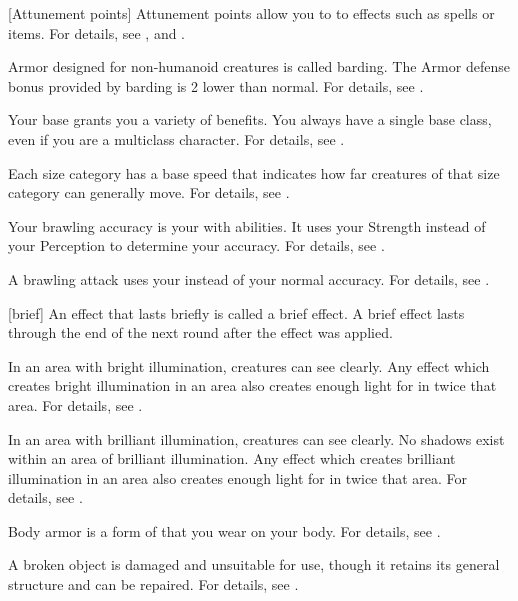 [Attunement points] Attunement points allow you to  to effects such as spells or items.
For details, see , and .

 Armor designed for non-humanoid creatures is called barding.
The Armor defense bonus provided by barding is 2 lower than normal.
For details, see .

 Your base  grants you a variety of benefits.
You always have a single base class, even if you are a multiclass character.
For details, see .

 Each size category has a base speed that indicates how far creatures of that size category can generally move.
For details, see .

 Your brawling accuracy is your  with \atBrawling abilities.
It uses your Strength instead of your Perception to determine your accuracy.
For details, see .

 A brawling attack uses your  instead of your normal accuracy.
For details, see .

[brief] An effect that lasts briefly is called a brief effect.
A brief effect lasts through the end of the next round after the effect was applied.

 In an area with bright illumination, creatures can see clearly.
Any effect which creates bright illumination in an area also creates enough light for  in twice that area.
For details, see .

 In an area with brilliant illumination, creatures can see clearly.
No shadows exist within an area of brilliant illumination.
Any effect which creates brilliant illumination in an area also creates enough light for  in twice that area.
For details, see .

 Body armor is a form of  that you wear on your body.
For details, see .

 A broken object is damaged and unsuitable for use, though it retains its general structure and can be repaired.
For details, see .

